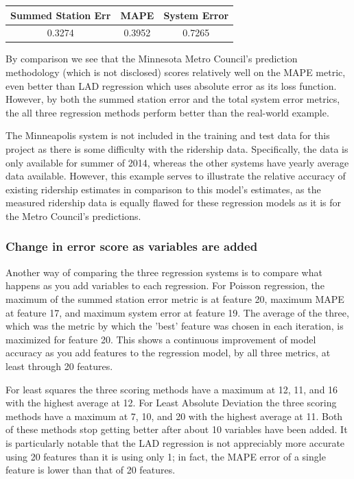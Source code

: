 \documentclass{article}
\begin{document}
\begin{center}
\begin{tabular}{ c c c}
\hline
Summed Station Err&MAPE&System Error \\
\hline
0.3274&0.3952&0.7265
\end{tabular}
\end{center}

By comparison we see that the Minnesota Metro Council's prediction methodology (which is not disclosed) scores relatively well on the MAPE metric, even better than LAD regression which uses absolute error as its loss function. However, by both the summed station error and the total system error metrics, the all three regression methods perform better than the real-world example. 

The Minneapolis system is not included in the training and test data for this project as there is some difficulty with the ridership data. Specifically, the data is only available for summer of 2014, whereas the other systems have yearly average data available. However, this example serves to illustrate the relative accuracy of existing ridership estimates in comparison to this model's estimates, as the measured ridership data is equally flawed for these regression models as it is for the Metro Council's predictions. 

\subsubsection*{Change in error score as variables are added} 

Another way of comparing the three regression systems is to compare what happens as you add variables to each regression. For Poisson regression, the maximum of the summed station error metric is at feature 20, maximum MAPE at feature 17, and maximum system error at feature 19. The average of the three, which was the metric by which the 'best' feature was chosen in each iteration, is maximized for feature 20. This shows a continuous improvement of model accuracy as you add features to the regression model, by all three metrics, at least through 20 features. 

For least squares the three scoring methods have a maximum at 12, 11, and 16 with the highest average at 12. For Least Absolute Deviation the three scoring methods have a maximum at 7, 10, and 20 with the highest average at 11. Both of these methods stop getting better after about 10 variables have been added. It is particularly notable that the LAD regression is not appreciably more accurate using 20 features than it is using only 1; in fact, the MAPE error of a single feature is lower than that of 20 features. 
\end{document}
